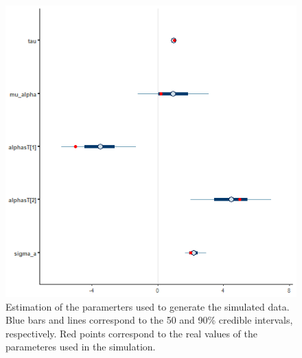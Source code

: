 \documentclass[
]{article}
\begin{document}
\begin{figure}

\includegraphics{simple_mcmc_intervals} \hfill{}

\caption{ Estimation of the paramerters used to generate the simulated data. Blue bars and lines correspond to the 50 and 90\% credible intervals, respectively. Red points correspond to the real values of the parameteres used in the simulation.}\label{fig:est_simple}
\end{figure}
\end{document}
